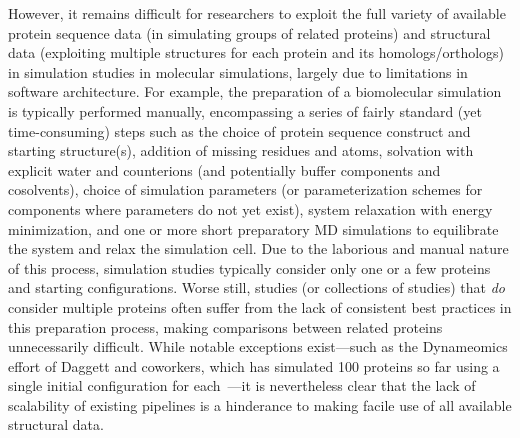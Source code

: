 \documentclass[aps,pre,twocolumn,nofootinbib,superscriptaddress,linenumbers]{revtex4-1}
\begin{document}
\color{red}
However, it remains difficult for researchers to exploit the full variety of available protein sequence data (in simulating groups of related proteins) and structural data (exploiting multiple structures for each protein and its homologs/orthologs) in simulation studies in molecular simulations, largely due to limitations in software architecture.
For example, the preparation of a biomolecular simulation is typically performed manually, encompassing a series of fairly standard (yet time-consuming) steps such as the choice of protein sequence construct and starting structure(s), addition of missing residues and atoms, solvation with explicit water and counterions (and potentially buffer components and cosolvents), choice of simulation parameters (or parameterization schemes for components where parameters do not yet exist),  system relaxation with energy minimization, and one or more short preparatory MD simulations to equilibrate the system and relax the simulation cell.
Due to the laborious and manual nature of this process, simulation studies typically consider only one or a few proteins and starting configurations.
Worse still, studies (or collections of studies) that \emph{do} consider multiple proteins often suffer from the lack of consistent best practices in this preparation process, making comparisons between related proteins unnecessarily difficult.
While notable exceptions exist---such as the Dynameomics effort of Daggett and coworkers, which has simulated 100 proteins so far using a single initial configuration for each~\cite{daggett:structure:2010:dynameomics}---it is nevertheless clear that the lack of scalability of existing pipelines is a hinderance to making facile use of all available structural data.
\end{document}

